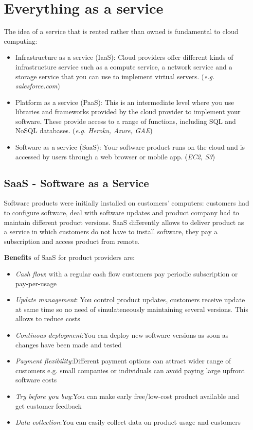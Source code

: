 \documentclass[10pt,a4paper]{report}
\begin{document}
\section{Everything as a service}
The idea of a service that is rented rather than owned is fundamental to
cloud computing:
\begin{itemize}
	\item Infrastructure as a service (IaaS):
	Cloud providers offer different kinds of infrastructure service such as a compute
	service, a network service and a storage service that you can use to implement
	virtual servers. (\textit{e.g. salesforce.com})
	\item Platform as a service (PaaS):
	This is an intermediate level where you use libraries and frameworks provided by
	the cloud provider to implement your software. These provide access to a range of
	functions, including SQL and NoSQL databases. (\textit{e.g. Heroku, Azure, GAE})
	\item Software as a service (SaaS): 
	Your software product runs on the cloud and is accessed by users through a web
	browser or mobile app. (\textit{EC2, S3})
\end{itemize}

\subsection{SaaS - Software as a Service}
Software products were initially installed on customers’ computers: customers had to configure software, deal with software updates and product company had to maintain different product versions.
SaaS differently allows to deliver product as a service in which customers do not have to install software, they pay a subscription and access product from remote. 

\textbf{Benefits} of SaaS for product providers are:
\begin{itemize}
	\item \textit{Cash flow}: with a regular cash flow customers pay periodic subscription or pay-per-usage
	
	\item \textit{Update management}: You control product updates, customers receive update at same time so no need of simulateneously maintaining several versions. This allows to reduce costs
	
	\item \textit{Continous deployment}:You can deploy new software versions as soon as changes have been made and tested
	
	\item \textit{Payment flexibility}:Different payment options can attract wider range of customers
	e.g. small companies or individuals can avoid paying large upfront software costs
	
	\item \textit{Try before you buy}:You can make early free/low-cost product available and get customer feedback
	
	\item \textit{Data collection}:You can easily collect data on product usage and customers
	
\end{itemize}
\end{document}
